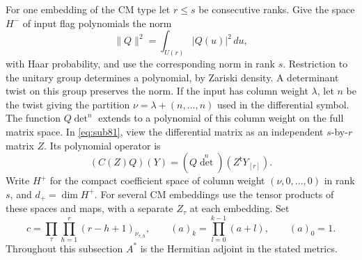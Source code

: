 \documentclass[a4paper,11pt]{article}
\theoremstyle{definition}
\theoremstyle{remark}
\numberwithin{equation}{section}
\begin{document}
For one embedding of the CM type let \(r\le s\) be consecutive
ranks. Give the space \(H^-\) of input flag polynomials the norm
\[
                  \|Q\|^2=\int_{U(r)}|Q(u)|^2\,du ,
\]
with Haar probability, and use the corresponding norm in rank
\(s\). Restriction to the unitary group determines a polynomial,
by Zariski density. A determinant twist on this group preserves
the norm. If the input has column weight \(\lambda\), let \(n\)
be the twist giving the partition \(\nu=\lambda+(n,\ldots,n)\)
used in the differential symbol. The function \(Q\det^n\)
extends to a polynomial of this column weight on the full
matrix space. In \eqref{eq:sub81}, view the differential matrix
as an independent \(s\)-by-\(r\) matrix \(Z\). Its polynomial
operator is
\[
   (C(Z)Q)(Y)=(Q\det^n)(Z^{\mathsf t}Y_{[r]}).
\]
Write \(H^+\) for the compact coefficient space of column weight
\((\nu,0,\ldots,0)\) in rank \(s\), and \(d_+=\dim H^+\).
For several CM embeddings use the tensor products of these spaces
and maps, with a separate \(Z_\tau\) at each embedding. Set
\[
   c=\prod_{\tau}\prod_{h=1}^r(r-h+1)_{\nu_{\tau,h}},
   \qquad (a)_k=\prod_{l=0}^{k-1}(a+l),\qquad (a)_0=1 .
\]
Throughout this subsection \(A^*\) is the Hermitian adjoint in
the stated metrics.
\end{document}
